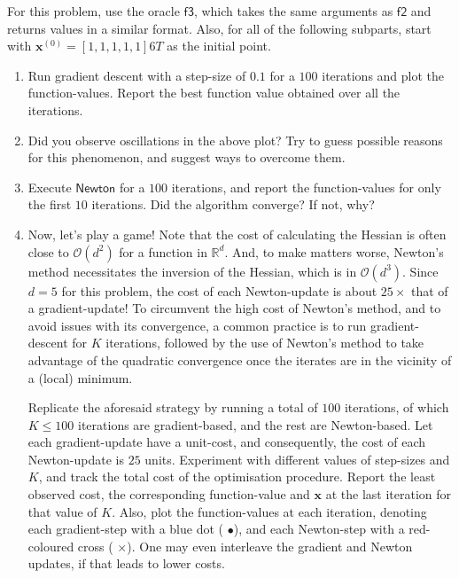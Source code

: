 \documentclass[12pt,a4paper]{article}
\newcommand{\R}{\mathbb{R}}
\theoremstyle{remark}
\begin{document}
For this problem, use the oracle $\mathsf{f3}$, which takes the same arguments as $\mathsf{f2}$ and returns values in a similar format. Also, for all of the following subparts, start with $\mathbf{x}^{(0)} = [1, 1, 1, 1, 1]6T$ as the initial point.

\begin{enumerate}
    \item Run gradient descent with a step-size of $0.1$ for a $100$ iterations and plot the function-values. Report the best function value obtained over all the iterations.
    \item Did you observe oscillations in the above plot? Try to guess possible reasons for this phenomenon, and suggest ways to overcome them.
    \item Execute $\mathsf{Newton}$ for a $100$ iterations, and report the function-values for only the first $10$ iterations. Did the algorithm converge? If not, why?
    \item Now, let's play a game! Note that the cost of calculating the Hessian is often close to $\mathcal{O}(d^2)$ for a function in $\R^d$. And, to make matters worse, Newton's method necessitates the inversion of the Hessian, which is in $\mathcal{O}(d^3)$. Since $d = 5$ for this problem, the cost of each Newton-update is about $25 \times$ that of a gradient-update! To circumvent the high cost of Newton's method, and to avoid issues with its convergence, a common practice is to run gradient-descent for $K$ iterations, followed by the use of Newton's method to take advantage of the quadratic convergence once the iterates are in the vicinity of a (local) minimum.
    
    Replicate the aforesaid strategy by running a total of $100$ iterations, of which $K \leq 100$ iterations are gradient-based, and the rest are Newton-based. Let each gradient-update have a unit-cost, and consequently, the cost of each Newton-update is $25$ units. Experiment with different values of step-sizes and $K$, and track the total cost of the optimisation procedure. Report the least observed cost, the corresponding function-value and $\mathbf{x}$ at the last iteration for that value of $K$. Also, plot the function-values at each iteration, denoting each gradient-step with a blue dot ({\color{blue} $\bullet$}), and each Newton-step with a red-coloured cross ({\color{red} $\times$}). One may even interleave the gradient and Newton updates, if that leads to lower costs.
\end{enumerate}
\end{document}
